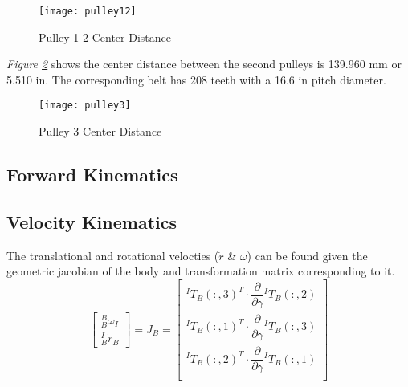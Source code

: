 \begin{figure}[htp]
  \center
  \texttt{[image: pulley12]}
  \caption{Pulley 1-2 Center Distance}
  \label{fig:pulley12}
\end{figure}
\emph{Figure \ref{fig:pulley3}} shows the center distance between the second pulleys is 139.960 mm or 5.510 in. The corresponding belt has 208 teeth with a 16.6 in pitch diameter.
\begin{figure}[htp]
  \center
  \texttt{[image: pulley3]}
  \caption{Pulley 3 Center Distance}
  \label{fig:pulley3}
\end{figure}


\newpage
\subsection{Forward Kinematics}

\newpage
\subsection{Velocity Kinematics}
The translational and rotational velocties ($\dot{r}$ \& $\omega$) can be found given the geometric jacobian of the body and transformation matrix corresponding to it.
\[
\begin{bmatrix}
  ^B_B\omega_I\\
  ^I_B\dot{r}_B
\end{bmatrix}
= J_B =
\begin{bmatrix}
  ^IT_B(:,3)^T \cdot \dfrac{\partial}{\partial\gamma}{}^IT_B(:,2) \\
  ^IT_B(:,1)^T \cdot \dfrac{\partial}{\partial\gamma}{}^IT_B(:,3) \\
  ^IT_B(:,2)^T \cdot \dfrac{\partial}{\partial\gamma}{}^IT_B(:,1) \\
\end{bmatrix}
\]



